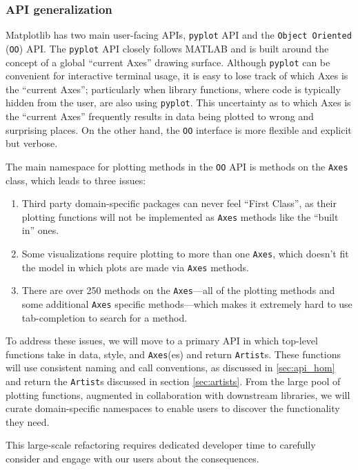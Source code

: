 \documentclass[11pt,letterpaper]{article}  %
\begin{document}
\subsubsection{API generalization}
\label{sec:api_gen}
Matplotlib has two main user-facing APIs, \texttt{pyplot} API 
and the \texttt{Object Oriented} (\texttt{OO})
API.  The \texttt{pyplot} API closely follows MATLAB and is built
around the concept of a global ``current Axes'' drawing surface.
Although \texttt{pyplot} can be convenient for interactive terminal
usage, it is easy to lose track of which Axes is the ``current Axes''; 
particularly when library functions, where code is typically hidden
from the user, are also using \texttt{pyplot}.
This uncertainty as to which Axes is the ``current Axes'' frequently results in data being
plotted to wrong and surprising places. On the other hand, the \texttt{OO} interface is more flexible and
explicit but verbose.

The main namespace for plotting methods in the \texttt{OO} API is
methods on the \texttt{Axes} class, which leads to three issues:
\begin{enumerate}
\item Third party domain-specific packages can never feel ``First
Class'', as their plotting functions will not be implemented as
\texttt{Axes} methods like the ``built in'' ones.
\item Some visualizations require plotting to more than one \texttt{Axes}, which 
doesn't fit the model in which plots are made via \texttt{Axes} methods.
\item There are over 250 methods on the \texttt{Axes}---all of the
plotting methods and some additional \texttt{Axes} specific
methods---which makes it extremely hard to use tab-completion to
search for a method.
\end{enumerate}

To address these issues, we will move to a primary API in which
top-level functions take in data, style, and \texttt{Axes}(es) and
return \texttt{Artist}s.  These functions will use consistent naming
and call conventions, as discussed in \ref{sec:api_hom} and return the
\texttt{Artist}s discussed in section \ref{sec:artists}. From the
large pool of plotting functions, augmented in collaboration with
downstream libraries, we will curate domain-specific namespaces to
enable users to discover the functionality they need.

This large-scale refactoring requires dedicated developer time to
carefully consider and engage with our users about the consequences.
\end{document}
